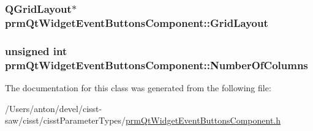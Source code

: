\subsubsection[{Grid\+Layout}]{\setlength{\rightskip}{0pt plus 5cm}Q\+Grid\+Layout$\ast$ prm\+Qt\+Widget\+Event\+Buttons\+Component\+::\+Grid\+Layout\hspace{0.3cm}{\ttfamily [protected]}}\label{classprm_qt_widget_event_buttons_component_ae56ef90e33c283732b965a26d6e082ba}
\hypertarget{classprm_qt_widget_event_buttons_component_ae0c4a7d1cdd342fcaf745ac4fc4f9378}{}
\subsubsection[{Number\+Of\+Columns}]{\setlength{\rightskip}{0pt plus 5cm}unsigned int prm\+Qt\+Widget\+Event\+Buttons\+Component\+::\+Number\+Of\+Columns\hspace{0.3cm}{\ttfamily [protected]}}\label{classprm_qt_widget_event_buttons_component_ae0c4a7d1cdd342fcaf745ac4fc4f9378}


The documentation for this class was generated from the following file\+:\begin{DoxyCompactItemize}
\item 
/\+Users/anton/devel/cisst-\/saw/cisst/cisst\+Parameter\+Types/\hyperlink{prm_qt_widget_event_buttons_component_8h}{prm\+Qt\+Widget\+Event\+Buttons\+Component.\+h}\end{DoxyCompactItemize}
